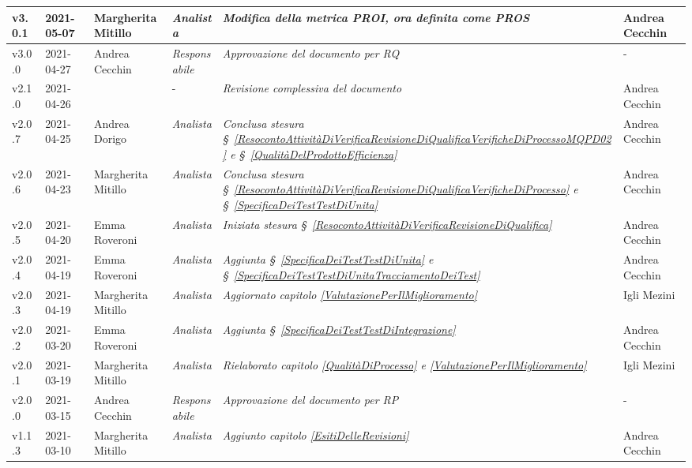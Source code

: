 {\begin{center}
\begin{longtable}[c]{|p{2cm-1\tabcolsep}|p{2cm}|p{}|p{}|p{}|p{4cm-2\tabcolsep}|}
		\centering v3.0.1 & 2021-05-07 & Margherita Mitillo & \centering\textit{Analista}  &  \textit{Modifica della metrica PROI, ora definita come PROS} & Andrea Cecchin \\
		\hline
		\centering v3.0.0 & 2021-04-27 & Andrea Cecchin & \centering\textit{Responsabile}  &  \textit{Approvazione del documento per RQ} & - \\
		\hline
		\centering v2.1.0 & 2021-04-26 &  & \centering -  &  \textit{Revisione complessiva del documento} & Andrea Cecchin \\
		\hline
		\centering v2.0.7 & 2021-04-25 & Andrea Dorigo & \centering \textit{Analista}  &  \textit{Conclusa stesura  \S~\ref{ResocontoAttivitàDiVerificaRevisioneDiQualificaVerificheDiProcessoMQPD02} e \S~\ref{QualitàDelProdottoEfficienza}} & Andrea Cecchin \\
		\hline
		\centering v2.0.6 & 2021-04-23 & Margherita Mitillo & \centering \textit{Analista}  &  \textit{Conclusa stesura  \S~\ref{ResocontoAttivitàDiVerificaRevisioneDiQualificaVerificheDiProcesso} e \S~\ref{SpecificaDeiTestTestDiUnita}} & Andrea Cecchin \\
		\hline
		\centering v2.0.5 & 2021-04-20 & Emma Roveroni & \centering \textit{Analista}  &  \textit{Iniziata stesura  \S~\ref{ResocontoAttivitàDiVerificaRevisioneDiQualifica}} & Andrea Cecchin \\
		\hline
		\centering v2.0.4 & 2021-04-19 & Emma Roveroni & \centering \textit{Analista}  &  \textit{Aggiunta \S~\ref{SpecificaDeiTestTestDiUnita} e \S~\ref{SpecificaDeiTestTestDiUnitaTracciamentoDeiTest}} & Andrea Cecchin \\
		\hline
		\centering v2.0.3 & 2021-04-19 & Margherita Mitillo  & \centering \textit{Analista}   &  \textit{Aggiornato capitolo \ref{ValutazionePerIlMiglioramento}} & Igli Mezini \\
		\hline
		\centering v2.0.2 & 2021-03-20 & Emma Roveroni & \centering \textit{Analista}  &  \textit{Aggiunta \S~\ref{SpecificaDeiTestTestDiIntegrazione}} & Andrea Cecchin \\
		\hline
		\centering v2.0.1 & 2021-03-19 & Margherita Mitillo  & \centering \textit{Analista}   &  \textit{Rielaborato capitolo \ref{QualitàDiProcesso} e \ref{ValutazionePerIlMiglioramento}} & Igli Mezini \\
		\hline
		\centering v2.0.0 & 2021-03-15 & Andrea Cecchin & \centering\textit{Responsabile}  &  \textit{Approvazione del documento per RP} & - \\
		\hline
		\centering v1.1.3 & 2021-03-10 & Margherita Mitillo  & \centering \textit{Analista}   &  \textit{Aggiunto capitolo \ref{EsitiDelleRevisioni} } & Andrea Cecchin\\

\end{longtable}
\end{center}}
